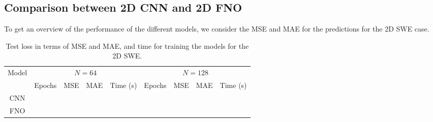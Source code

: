 \subsection{Comparison between 2D CNN and 2D FNO}


To get an overview of the performance of the different models, we consider the MSE and MAE for the predictions for the 2D SWE case.
\begin{table}[H]
    \centering
    \small %
    \begin{tabular}{c|cccc|cccc}
        Model & \multicolumn{4}{c|}{$N = 64$} & \multicolumn{4}{c}{$N = 128$} \\
        \cline{2-9}
        & Epochs & MSE & MAE & Time (s) & Epochs & MSE & MAE & Time (s) \\
        \hline
        CNN  &
         &
         & 
         &
         &
         &
         &
         &
         
        \\
        \hline
        FNO  &
         &
         &
         &
         &
         &
         &
         &
        
        \\
        \hline
    \end{tabular}
    \caption{Test loss in terms of MSE and MAE, and time for training the models for the 2D SWE.}\label{tab:results_2D_comparison}
\end{table}
